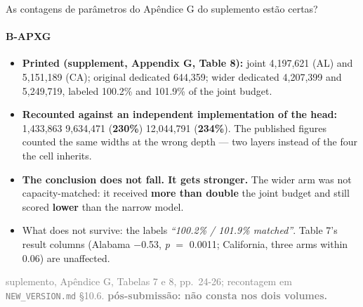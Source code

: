 \documentclass{beamer}
\begin{document}
\begin{frame}[noframenumbering]{As contagens de parâmetros do Apêndice G do suplemento estão certas?}
    \framesubtitle{B-APXG}
    \hypertarget{bapxg}{}
    \small
    \begin{itemize}\setlength{\itemsep}{0pt}\setlength{\parskip}{0pt}
        \item \textbf{Printed (supplement, Appendix G, Table 8):} joint 4,197,621 (AL) and 5,151,189 (CA); original dedicated 644,359; wider dedicated 4,207,399 and 5,249,719, labeled 100.2\% and 101.9\% of the joint budget.
        \item \textbf{Recounted against an independent implementation of the head:} 1,433,863 \textbullet{} 9,634,471 (\textbf{230\%}) \textbullet{} 12,044,791 (\textbf{234\%}). The published figures counted the same widths at the wrong depth --- two layers instead of the four the cell inherits.
        \item \textbf{The conclusion does not fall. It gets stronger.} The wider arm was not capacity-matched: it received \textbf{more than double} the joint budget and still scored \textbf{lower} than the narrow model.
        \item What does not survive: the labels \textit{``100.2\% / 101.9\% matched''}. Table 7's result columns (Alabama $-$0.53, \textit{p} $=$ 0.0011; California, three arms within 0.06) are unaffected.
    \end{itemize}
    \vfill
    {\scriptsize
    \begin{minipage}[b]{0.775\linewidth}\raggedright\textcolor{gray}{suplemento, Apêndice G, Tabelas 7 e 8, pp.~24-26; recontagem em \texttt{NEW\_VERSION.md} §10.6. \textbf{pós-submissão: não consta nos dois volumes.}}\end{minipage}\hfill
    \begin{minipage}[b]{0.20\linewidth}\raggedleft \hyperlink{b0}{}\end{minipage}}
\end{frame}
\end{document}
